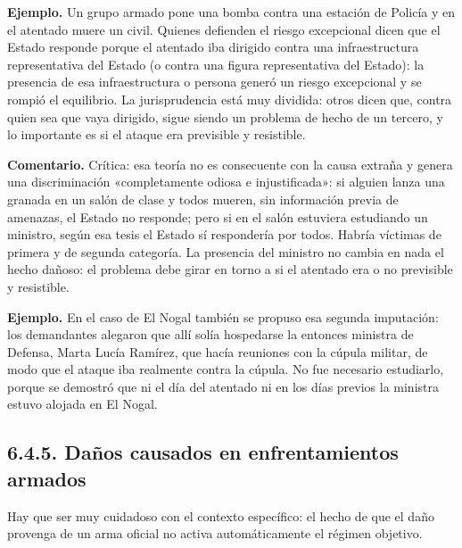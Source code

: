 \begin{ejemplo}
\textcolor[HTML]{4F6228}{\textbf{Ejemplo. }}Un grupo armado pone una bomba contra una estación de Policía y en el atentado muere un civil. Quienes defienden el riesgo excepcional dicen que el Estado responde porque el atentado iba dirigido contra una infraestructura representativa del Estado (o contra una figura representativa del Estado): la presencia de esa infraestructura o persona generó un riesgo excepcional y se rompió el equilibrio. La jurisprudencia está muy dividida: otros dicen que, contra quien sea que vaya dirigido, sigue siendo un problema de hecho de un tercero, y lo importante es si el ataque era previsible y resistible.
\end{ejemplo}
\begin{comentario}
\textcolor[HTML]{8A6D3B}{\textbf{Comentario. }}Crítica: esa teoría no es consecuente con la causa extraña y genera una discriminación «completamente odiosa e injustificada»: si alguien lanza una granada en un salón de clase y todos mueren, sin información previa de amenazas, el Estado no responde; pero si en el salón estuviera estudiando un ministro, según esa tesis el Estado sí respondería por todos. Habría víctimas de primera y de segunda categoría. La presencia del ministro no cambia en nada el hecho dañoso: el problema debe girar en torno a si el atentado era o no previsible y resistible.
\end{comentario}
\begin{ejemplo}
\textcolor[HTML]{4F6228}{\textbf{Ejemplo. }}En el caso de El Nogal también se propuso esa segunda imputación: los demandantes alegaron que allí solía hospedarse la entonces ministra de Defensa, Marta Lucía Ramírez, que hacía reuniones con la cúpula militar, de modo que el ataque iba realmente contra la cúpula. No fue necesario estudiarlo, porque se demostró que ni el día del atentado ni en los días previos la ministra estuvo alojada en El Nogal.
\end{ejemplo}
\subsection{6.4.5. Daños causados en enfrentamientos armados}
Hay que ser muy cuidadoso con el contexto específico: el hecho de que el daño provenga de un arma oficial no activa automáticamente el régimen objetivo.

